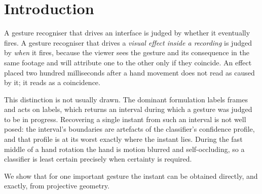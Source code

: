\documentclass{article}
\theoremstyle{definition}
\begin{document}
\begin{abstract}
Against a corpus with exact ground truth the criterion detects $95\%$ of flips
with no false positive in $240$ near-miss sequences, and places each detection
within $6.7$\,ms on average of the instant it occurred: a sixth of the interval
at which the hand is observed. Reporting an event more finely than one samples is
the practical consequence of treating a gesture as the zero of a continuous
quantity rather than as a label attached to a frame, and it is unavailable to a
classifier operating on the same stream. We state plainly what remains
unverified.
\end{abstract}


\section{Introduction}

A gesture recogniser that drives an interface is judged by whether it eventually
fires. A gesture recogniser that drives a \emph{visual effect inside a recording}
is judged by \emph{when} it fires, because the viewer sees the gesture and its
consequence in the same footage and will attribute one to the other only if they
coincide. An effect placed two hundred milliseconds after a hand movement does
not read as caused by it; it reads as a coincidence.

This distinction is not usually drawn. The dominant formulation labels frames and
acts on labels, which returns an interval during which a gesture was judged to be
in progress. Recovering a single instant from such an interval is not well posed:
the interval's boundaries are artefacts of the classifier's confidence profile,
and that profile is at its worst exactly where the instant lies. During the fast
middle of a hand rotation the hand is motion blurred and self-occluding, so a
classifier is least certain precisely when certainty is required.

We show that for one important gesture the instant can be obtained directly, and
exactly, from projective geometry.
\end{document}
